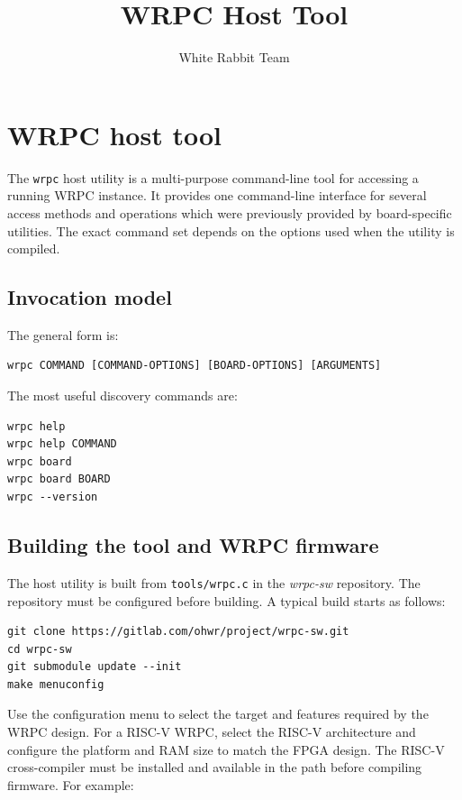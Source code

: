 \documentclass[a4paper,12pt]{article}
\title{WRPC Host Tool}
\author{White Rabbit Team}
\begin{document}
\maketitle
\fi

\section{WRPC host tool}
\label{appendix:wrpc_tool}

The \texttt{wrpc} host utility is a multi-purpose command-line tool for
accessing a running WRPC instance. It provides one command-line interface for
several access methods and operations which were previously provided by
board-specific utilities. The exact command set depends on the options used
when the utility is compiled.

\subsection{Invocation model}

The general form is:

\begin{lstlisting}
wrpc COMMAND [COMMAND-OPTIONS] [BOARD-OPTIONS] [ARGUMENTS]
\end{lstlisting}

The most useful discovery commands are:

\begin{lstlisting}
wrpc help
wrpc help COMMAND
wrpc board
wrpc board BOARD
wrpc --version
\end{lstlisting}

\subsection{Building the tool and WRPC firmware}

The host utility is built from \texttt{tools/wrpc.c} in the \textit{wrpc-sw}
repository. The repository must be configured before building. A typical build
starts as follows:

\begin{lstlisting}
git clone https://gitlab.com/ohwr/project/wrpc-sw.git
cd wrpc-sw
git submodule update --init
make menuconfig
\end{lstlisting}

Use the configuration menu to select the target and features required by the
WRPC design. For a RISC-V WRPC, select the RISC-V architecture and configure
the platform and RAM size to match the FPGA design. The RISC-V cross-compiler
must be installed and available in the path before compiling firmware. For
example:
\end{document}
